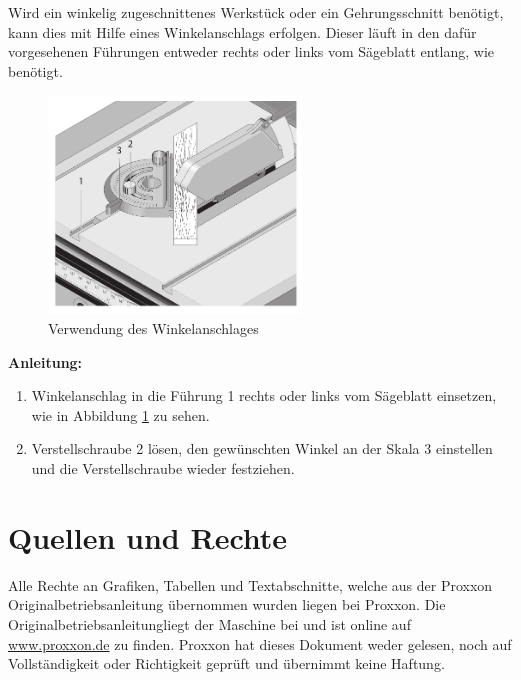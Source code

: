 \documentclass{\basedir/fablab-document}
\begin{document}
Wird ein winkelig zugeschnittenes Werkstück oder ein Gehrungsschnitt benötigt, kann dies mit Hilfe eines Winkelanschlags erfolgen. Dieser läuft in den dafür vorgesehenen Führungen entweder rechts oder links vom Sägeblatt entlang, wie benötigt.

\begin{figure} [h]
	\centering
	\includegraphics[width=0.6\textwidth]{bilder/Winkelanschlag.pdf}
	\caption{Verwendung des Winkelanschlages}
	\label{fig:winkelanschlag}
\end{figure}

\textbf{Anleitung:} \\
\renewcommand{\labelenumi}{\alph{enumi})}
\begin{enumerate}
	\item Winkelanschlag in die Führung 1 rechts oder links vom Sägeblatt einsetzen, wie in Abbildung \ref{fig:winkelanschlag} zu sehen.
	\item Verstellschraube 2 lösen, den gewünschten Winkel an der Skala 3 einstellen und die Verstellschraube wieder festziehen.

\end{enumerate}


\section{Quellen und Rechte}
\label{quellen}
Alle Rechte an Grafiken, Tabellen und Textabschnitte, welche aus der Proxxon Originalbetriebsanleitung übernommen wurden liegen bei Proxxon. Die \glqq Originalbetriebsanleitung\grqq liegt der Maschine bei und ist online auf \url{www.proxxon.de} zu finden. Proxxon hat dieses Dokument weder gelesen, noch auf Vollständigkeit oder Richtigkeit geprüft und übernimmt keine Haftung.
\end{document}
